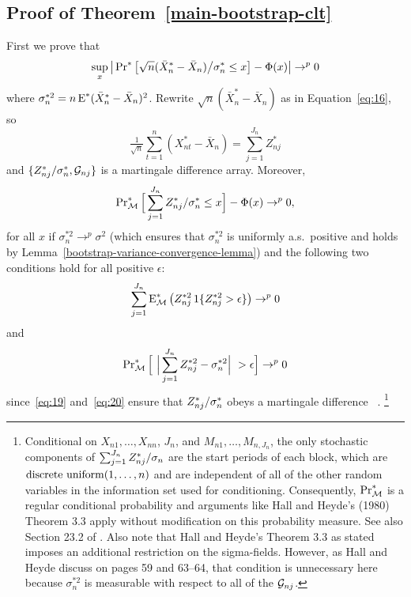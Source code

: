 \documentclass[11pt]{article}
\begin{document}
\subsection*{Proof of Theorem~\ref{main-bootstrap-clt}}
{%
\newcommand{\Db}[1][j]{D_{n#1}^{*}}
\newcommand{\Zsum}{\sum_{j=1}^{J_n} \Zb / \sigma_n}
First we prove that
\begin{equation}\label{eq:37}
  \sup_x \big\lvert \operatorname{Pr}^{*}\big[
  \sqrt{n}(\bar X_{n}^{*} -  \bar X_n) \big/ \sigma_n^{*}
  \leq x \big] - \Phi(x) \big\rvert \to^p 0
\end{equation}
where $\sigma_n^{*2} = n \operatorname{E}^* (\bar X_n^* - \bar X_n)^2$.
Rewrite $\sqrt{n}(\bar X_{n}^{*} - \bar X_n)$ as in
Equation~\eqref{eq:16}, so
\begin{equation*}
  \tfrac{1}{\sqrt{n}} \sum_{t=1}^n (X_{nt}^* - \bar X_n) =
  \sum_{j=1}^{J_n} Z_{nj}^*
\end{equation*}
and $\{{Z^*_{n{j}}} / \sigma_n^*, \mathcal{G}_{nj}\}$ is a martingale difference
array. Moreover,
\begin{equation}
  \label{eq:18}
  \operatorname{Pr}_{\mathcal{M}}^{*} \Big[\sum_{j=1}^{J_n} {Z^*_{n{j}}} / \sigma_n^* \leq x \Big] - \Phi(x) \to^p 0,
\end{equation}
for all $x$ if $\sigma_n^{*2} \to^p \sigma^2$ (which ensures that
$\sigma_n^{*2}$ is uniformly a.s.\ positive and holds by
Lemma~\ref{bootstrap-variance-convergence-lemma}) and the following
two conditions hold for all positive $\epsilon$:
\begin{equation}
  \label{eq:19}
  \sum_{j=1}^{J_n} \operatorname{E}_{\mathcal{M}}^{*} \big(Z_{nj}^{*2} \operatorname{1}\{Z_{nj}^{*2}  >
  \epsilon\}\big) \to^p 0
\end{equation}
and
\begin{equation}
  \label{eq:20}
  \operatorname{Pr}_{\mathcal{M}}^{*}\Big[\ \Big|\sum_{j=1}^{J_n} Z_{nj}^{*2} - \sigma_n^{*2}
  \Big|\ > \epsilon \Big] \to^p 0
\end{equation}
since~\eqref{eq:19} and~\eqref{eq:20} ensure that ${Z^*_{n{j}}}/\sigma_n^*$ obeys
a martingale difference \clt\ \citep[e.g.][Theorem 3.3]{HaH:80}.%
\footnote{Conditional on $X_{n1},\dots,X_{nn}$, $J_n$, and
  $M_{n1},\dots,M_{n,J_n}$, the only stochastic components of $\Zsum$
  are the start periods of each block, which are
  $\operatorname{discrete\ uniform}(1,\dots,n)$ and are independent of all of the
  other random variables in the information set used for conditioning.
  Consequently, $\operatorname{Pr}_{\mathcal{M}}^*$ is a regular conditional probability and
  arguments like Hall and Heyde's (1980) Theorem 3.3
  apply without modification on this probability measure. See
  also Section 23.2 of \citet{Vaa:00}.
  Also note that Hall and Heyde's Theorem 3.3 as stated imposes an
  additional restriction on the sigma-fields. However, as Hall and
  Heyde discuss on pages 59 and 63--64, that condition is unnecessary
  here because $\sigma_n^{*2}$ is measurable with respect to
  all of the $\mathcal{G}_{nj}$.} %

}
\end{document}
